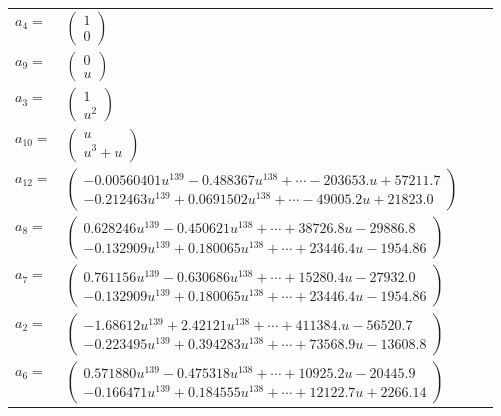 \documentclass[1p]{elsarticle_modified}
\theoremstyle{definition}
\begin{document}
\begin{tabular}{m{7pt} m{180pt} m{7pt} m{180pt} }
\flushright $a_{4}=$&$\begin{pmatrix}1\\0\end{pmatrix}$ \\
\flushright $a_{9}=$&$\begin{pmatrix}0\\u\end{pmatrix}$ \\
\flushright $a_{3}=$&$\begin{pmatrix}1\\u^2\end{pmatrix}$ \\
\flushright $a_{10}=$&$\begin{pmatrix}u\\u^3+u\end{pmatrix}$ \\
\flushright $a_{12}=$&$\begin{pmatrix}-0.00560401 u^{139}-0.488367 u^{138}+\cdots-203653. u+57211.7\\-0.212463 u^{139}+0.0691502 u^{138}+\cdots-49005.2 u+21823.0\end{pmatrix}$ \\
\flushright $a_{8}=$&$\begin{pmatrix}0.628246 u^{139}-0.450621 u^{138}+\cdots+38726.8 u-29886.8\\-0.132909 u^{139}+0.180065 u^{138}+\cdots+23446.4 u-1954.86\end{pmatrix}$ \\
\flushright $a_{7}=$&$\begin{pmatrix}0.761156 u^{139}-0.630686 u^{138}+\cdots+15280.4 u-27932.0\\-0.132909 u^{139}+0.180065 u^{138}+\cdots+23446.4 u-1954.86\end{pmatrix}$ \\
\flushright $a_{2}=$&$\begin{pmatrix}-1.68612 u^{139}+2.42121 u^{138}+\cdots+411384. u-56520.7\\-0.223495 u^{139}+0.394283 u^{138}+\cdots+73568.9 u-13608.8\end{pmatrix}$ \\
\flushright $a_{6}=$&$\begin{pmatrix}0.571880 u^{139}-0.475318 u^{138}+\cdots+10925.2 u-20445.9\\-0.166471 u^{139}+0.184555 u^{138}+\cdots+12122.7 u+2266.14\end{pmatrix}$ \\

\end{tabular}
\end{document}
